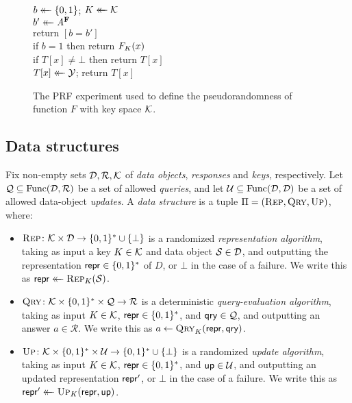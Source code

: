 \begin{figure}
  {
    \\[2pt]
      $b \mathrel{\leftarrow\mkern-14mu\leftarrow} \{0,1\}$; $K \mathrel{\leftarrow\mkern-14mu\leftarrow} \mathcal{K}$\\
      $b' \mathrel{\leftarrow\mkern-14mu\leftarrow} \mathit{A}^{\textup{\textbf{F}}\hspace{0.5pt}}$\\
      return $[b = b']$
  }
  {
    \\[2pt]
      if $b = 1$ then return $F_K(x)$\\
      if $T[x] \neq \bot$ then return $T[x]$\\
      $T[x] \mathrel{\leftarrow\mkern-14mu\leftarrow} \mathcal{Y}$; return $T[x]$
  }
  \caption{The PRF experiment used to define the pseudorandomness of function
  $F$ with key space $\mathcal{K}$.
  }
  \label{fig:prf-def}
  \vspace{-8pt}
\end{figure}

\subsection{Data structures}
Fix non-empty sets $\mathcal{D}, \mathcal{R}, \mathcal{K}$ of \emph{data objects},
\emph{responses} and \emph{keys}, respectively.  Let $\mathcal{Q}\subseteq
\mathrm{Func}(\mathcal{D},\mathcal{R})$ be a set of allowed \emph{queries}, and let
$\mathcal{U} \subseteq \mathrm{Func}(\mathcal{D},\mathcal{D})$ be a set of allowed
data-object \emph{updates}.  A {\em data structure} is a tuple $\Pi =
(\textnormal{\textsc{Rep}},\textnormal{\textsc{Qry}},\textnormal{\textsc{Up}})$, where:

\begin{itemize}[leftmargin=.2in]
  \item $\textnormal{\textsc{Rep}}\colon \mathcal{K} \times \mathcal{D} \to \{0,1\}^* \cup \{\bot\}$ is a
  randomized {\em representation algorithm}, taking as input a key $K \in
  \mathcal{K}$ and data object $\mathcal{S} \in \mathcal{D}$, and outputting the
  representation $\mathsf{repr} \in \{0,1\}^*$ of $D$, or $\bot$ in the case of a
  failure. We write this as $\mathsf{repr} \mathrel{\leftarrow\mkern-14mu\leftarrow} \textnormal{\textsc{Rep}}_K(\mathcal{S})$.
%
  \item $\textnormal{\textsc{Qry}}\colon \mathcal{K} \times \{0,1\}^* \times \mathcal{Q} \to \mathcal{R}$
  is a deterministic {\em query-evaluation algorithm}, taking as input $K \in
  \mathcal{K}$, $\mathsf{repr} \in \{0,1\}^*$, and $\mathsf{qry} \in \mathcal{Q}$, and outputting an
  answer $a \in \mathcal{R}$. We write this as $a \gets \textnormal{\textsc{Qry}}_K(\mathsf{repr},\mathsf{qry})$.
%
  \item $\textnormal{\textsc{Up}}\colon \mathcal{K} \times \{0,1\}^* \times \mathcal{U} \to \{0,1\}^* \cup
  \{\bot\}$ is a randomized {\em update algorithm}, taking as input $K \in
  \mathcal{K}$, $\mathsf{repr} \in \{0,1\}^*$, and $\mathsf{up} \in \mathcal{U}$, and outputting an
  updated representation $\mathsf{repr}'$, or $\bot$ in the case of a failure. We write
  this as $\mathsf{repr}' \mathrel{\leftarrow\mkern-14mu\leftarrow} \textnormal{\textsc{Up}}_K(\mathsf{repr},\mathsf{up})$.
\end{itemize}

